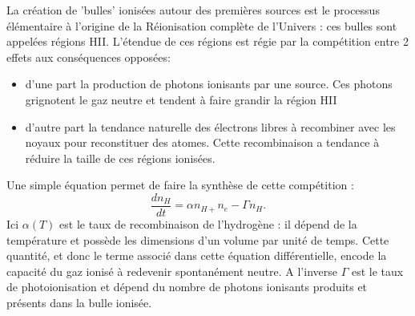 La création de 'bulles' ionisées autour des premières sources est le processus élémentaire à l'origine de la Réionisation complète de l'Univers : ces bulles sont appelées régions HII. L'étendue de ces régions est régie par la compétition entre 2 effets aux conséquences opposées:
\begin{itemize}
\item d'une part la production de photons ionisants par une source. Ces photons  grignotent le gaz neutre et tendent à faire grandir la région HII
\item d'autre part la tendance naturelle des électrons libres à recombiner avec les noyaux pour reconstituer des atomes. Cette recombinaison a tendance à réduire la taille de ces régions ionisées.
\end{itemize}
Une simple équation permet de faire la synthèse de cette compétition :
\begin{equation}
\frac{d n_H}{dt}=\alpha n_{H+}n_e -\Gamma n_H.
\end{equation}
Ici $\alpha(T)$ est le taux de recombinaison de l'hydrogène : il dépend de la température et possède les dimensions d'un volume par unité de temps. Cette quantité, et donc le terme associé dans cette équation différentielle, encode la capacité du gaz ionisé à redevenir spontanément neutre.  A l'inverse $\Gamma$ est le taux de photoionisation et dépend du nombre de photons ionisants produits et présents dans la bulle ionisée.

